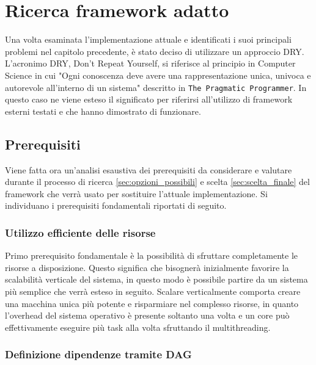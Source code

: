 \chapter{Ricerca framework adatto}
\label{sec:ricerca_framework}

Una volta esaminata l'implementazione attuale e identificati i suoi principali
problemi nel capitolo precedente, è stato deciso di utilizzare un approccio DRY.
L'acronimo DRY, Don't Repeat Yourself, si riferisce al principio in Computer
Science in cui "Ogni conoscenza deve avere una rappresentazione unica, univoca e
autorevole all’interno di un sistema" descritto in \texttt{The Pragmatic
Programmer}\cite{thomas2019pragmatic}. In questo caso ne viene esteso il
significato per riferirsi all'utilizzo di framework esterni testati e che hanno
dimostrato di funzionare.

\section{Prerequisiti}
\label{sec:prerequisiti}

Viene fatta ora un'analisi esaustiva dei prerequisiti da considerare e valutare durante
il processo di ricerca \ref{sec:opzioni_possibili} e scelta \ref{sec:scelta_finale}
del framework che verrà usato per sostituire l'attuale implementazione. Si
individuano i prerequisiti fondamentali riportati di seguito.

\subsection{Utilizzo efficiente delle risorse}
\label{sub:resource_usage}

Primo prerequisito fondamentale è la possibilità di sfruttare completamente le risorse
a disposizione. Questo significa che bisognerà inizialmente favorire la
scalabilità verticale del sistema, in questo modo è possibile partire da un sistema
più semplice che verrà esteso in seguito. Scalare verticalmente comporta creare
una macchina unica più potente e risparmiare nel complesso risorse, in quanto l'overhead
del sistema operativo è presente soltanto una volta e un core può effettivamente
eseguire più task alla volta sfruttando il multithreading.

\subsection{Definizione dipendenze tramite DAG}
\label{sub:deps_definition}

